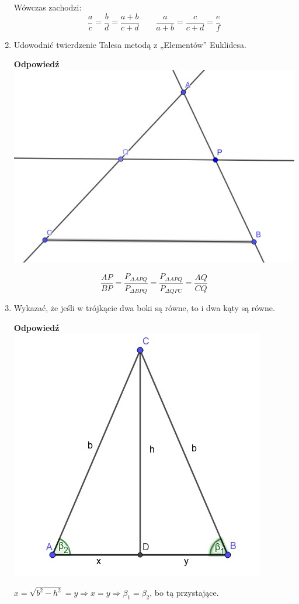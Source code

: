 \documentclass[12pt,a4paper]{article}
\newcounter{twierdzenie}
\theoremstyle{break}
\newcommand{\Odp}[1]{
		\begin{mdframed}[style=zadanie]
			\textbf{Odpowiedź}\\
			#1
		\end{mdframed}
	}
\begin{document}
\begin{enumerate}[1.]
{		Wówczas zachodzi:
		$$\frac{a}{c}=\frac{b}{d}=\frac{a+b}{c+d}\qquad\frac{a}{a+b}=\frac{c}{c+d}=\frac{e}{f}$$
	}
	
	\item Udowodnić twierdzenie Talesa metodą z „Elementów” Euklidesa.
	\Odp{
		\includegraphics[width=\linewidth]{tales_proof.jpeg}
		
		$$\frac{AP}{BP}=\frac{P_{\Delta APQ}}{P_{\Delta BPQ}}=\frac{P_{\Delta APQ}}{P_{\Delta QPC}}=\frac{AQ}{CQ}$$
	}
	
	\item Wykazać, że jeśli w trójkącie dwa boki są równe, to i dwa kąty są równe.
	\Odp{
		\includegraphics[width=0.5\linewidth]{trj_proof_1.jpeg}
		
		$x=\sqrt{b^2-h^2}=y \Rightarrow x=y \Rightarrow \beta_1=\beta_2$, bo tą przystające.
	}
	

\end{enumerate}
\end{document}
